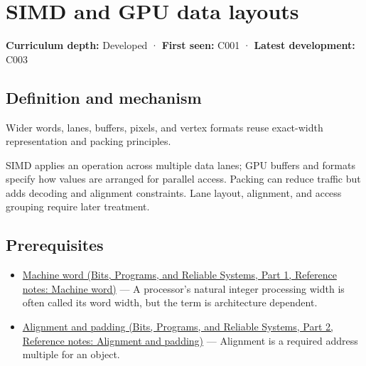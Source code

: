 \hypertarget{appendix-3c7b1a56de01}{}\label{referencestart:appendix-3c7b1a56de01}
\section{SIMD and GPU data layouts}\label{appendix-3c7b1a56de01-simd-and-gpu-data-layouts}

\hypertarget{appendix-3c7b1a56de01-simd-and-gpu-data-layouts}{}

\textbf{Curriculum depth:} Developed · \textbf{First seen:} C001 · \textbf{Latest development:} C003

\begin{allmightroledefinition}

\subsection{Definition and mechanism}\label{appendix-3c7b1a56de01-definition-and-mechanism}

\hypertarget{appendix-3c7b1a56de01-definition-and-mechanism}{}

Wider words, lanes, buffers, pixels, and vertex formats reuse exact-width representation and packing principles.

\end{allmightroledefinition}

SIMD applies an operation across multiple data lanes; GPU buffers and formats specify how values are arranged for parallel access. Packing can reduce traffic but adds decoding and alignment constraints. Lane layout, alignment, and access grouping require later treatment.

\subsection{Prerequisites}\label{appendix-3c7b1a56de01-prerequisites}

\hypertarget{appendix-3c7b1a56de01-prerequisites}{}

\begin{itemize}
\tightlist
\item
  \href{../01-Bits-Programs-and-Reliable-Systems-P01/main.pdf\#nameddest=appendix-d67a19507dc5}{Machine word (Bits, Programs, and Reliable Systems, Part 1, Reference notes: Machine word)} --- A processor's natural integer processing width is often called its word width, but the term is architecture dependent.
\item
  \href{../01-Bits-Programs-and-Reliable-Systems-P02/main.pdf\#nameddest=appendix-a1f7c53b4742}{Alignment and padding (Bits, Programs, and Reliable Systems, Part 2, Reference notes: Alignment and padding)} --- Alignment is a required address multiple for an object.
\end{itemize}

